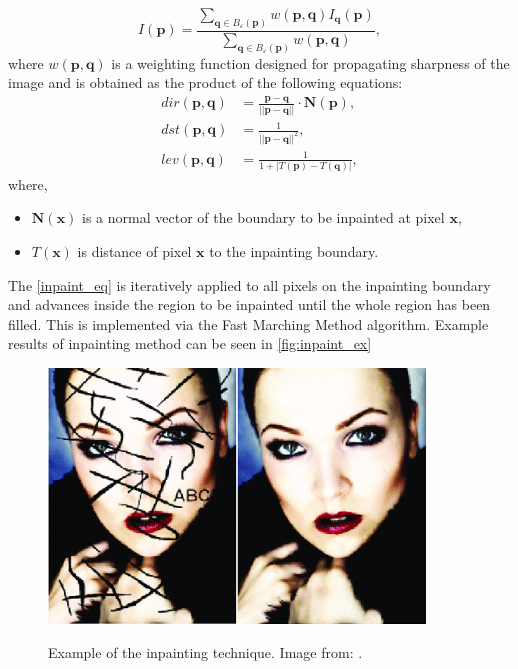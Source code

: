 \documentclass[twoside]{ctuthesis}
\theoremstyle{plain}
\theoremstyle{definition}
\theoremstyle{note}
\begin{document}
\begin{equation}\label{inpaint_eq}
	I(\mathbf{p})=\frac{\sum_{\mathbf{q}\in B_{\varepsilon}(\mathbf{p})}w(\mathbf{p},\mathbf{q})I_{\mathbf{q}}(\mathbf{p})}{\sum_{\mathbf{q}\in B_{\varepsilon}(\mathbf{p})}w(\mathbf{p},\mathbf{q})},
\end{equation}
where $w(\mathbf{p},\mathbf{q})$ is a weighting function designed for propagating sharpness of the image and is obtained as the product of the following equations:
\begin{equation}
	\begin{aligned}
		dir(\mathbf{p},\mathbf{q})&=\frac{\mathbf{p}-\mathbf{q}}{||\mathbf{p}-\mathbf{q}||}\cdot\mathbf{N(p)},\\
		dst(\mathbf{p},\mathbf{q})&=\frac{1}{||\mathbf{p}-\mathbf{q}||^2},\\
		lev(\mathbf{p},\mathbf{q})&=\frac{1}{1+|T(\mathbf{p})-T(\mathbf{q})|},
	\end{aligned}
\end{equation}
where,
\begin{itemize}
	\item $\mathbf{N(x)}$ is a normal vector of the boundary to be inpainted at pixel $\mathbf{x}$,
	\item $T(\mathbf{x})$ is distance of pixel $\mathbf{x}$ to the inpainting boundary.
\end{itemize}
The \eqref{inpaint_eq} is iteratively applied to all pixels on the inpainting boundary and advances inside the region to be inpainted until the whole region has been filled. This is implemented via the Fast Marching Method algorithm. Example results of inpainting method can be seen in \autoref{fig:inpaint_ex}
\begin{figure}
	\caption{Example of the inpainting technique. Image from: \cite{cite:5}.}
	\includegraphics[width=10cm]{inpaint_example.png}
	\centering
	\label{fig:inpaint_ex}
\end{figure}
\end{document}
